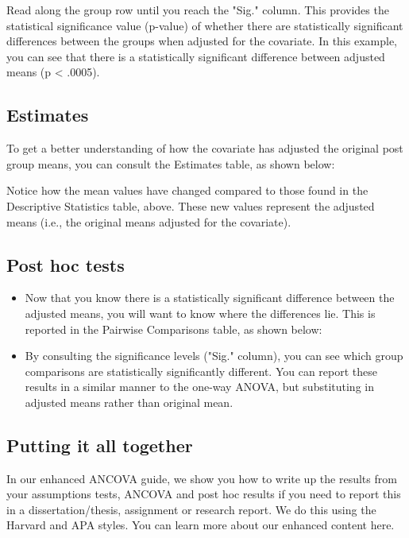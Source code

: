 Read along the group row until you reach the "Sig." column. This provides the statistical significance value (p-value) of whether there are statistically significant differences between the groups when adjusted for the covariate. In this example, you can see that there is a statistically significant difference between adjusted means (p < .0005).


\subsection{Estimates}
To get a better understanding of how the covariate has adjusted the original post group means, you can consult the Estimates table, as shown below:


Notice how the mean values have changed compared to those found in the Descriptive Statistics table, above. These new values represent the adjusted means (i.e., the original means adjusted for the covariate).



\subsection{Post hoc tests}
\begin{itemize}
\item 
Now that you know there is a statistically significant difference between the adjusted means, you will want to know where the differences lie. This is reported in the Pairwise Comparisons table, as shown below:
\item 

By consulting the significance levels ("Sig." column), you can see which group comparisons are statistically significantly different. You can report these results in a similar manner to the one-way ANOVA, but substituting in adjusted means rather than original mean.
\end{itemize}


\subsection{Putting it all together}
In our enhanced ANCOVA guide, we show you how to write up the results from your assumptions tests, ANCOVA and post hoc results if you need to report this in a dissertation/thesis, assignment or research report. We do this using the Harvard and APA styles. You can learn more about our enhanced content here.
